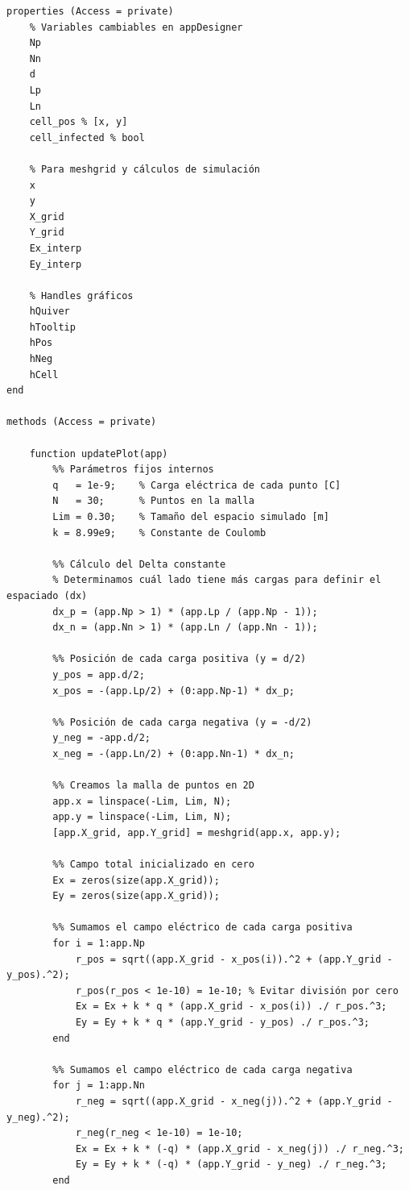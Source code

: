 \begin{lstlisting}[style=Matlab-editor]
properties (Access = private)
    % Variables cambiables en appDesigner
    Np
    Nn
    d
    Lp
    Ln
    cell_pos % [x, y]
    cell_infected % bool
    
    % Para meshgrid y cálculos de simulación
    x
    y
    X_grid
    Y_grid
    Ex_interp
    Ey_interp
    
    % Handles gráficos
    hQuiver
    hTooltip
    hPos
    hNeg
    hCell 
end

methods (Access = private)
    
    function updatePlot(app)
        %% Parámetros fijos internos
        q   = 1e-9;    % Carga eléctrica de cada punto [C]
        N   = 30;      % Puntos en la malla
        Lim = 0.30;    % Tamaño del espacio simulado [m]
        k = 8.99e9;    % Constante de Coulomb

        %% Cálculo del Delta constante
        % Determinamos cuál lado tiene más cargas para definir el espaciado (dx)
        dx_p = (app.Np > 1) * (app.Lp / (app.Np - 1));
        dx_n = (app.Nn > 1) * (app.Ln / (app.Nn - 1));
        
        %% Posición de cada carga positiva (y = d/2)
        y_pos = app.d/2;
        x_pos = -(app.Lp/2) + (0:app.Np-1) * dx_p;
        
        %% Posición de cada carga negativa (y = -d/2)
        y_neg = -app.d/2;
        x_neg = -(app.Ln/2) + (0:app.Nn-1) * dx_n;
        
        %% Creamos la malla de puntos en 2D
        app.x = linspace(-Lim, Lim, N);
        app.y = linspace(-Lim, Lim, N);
        [app.X_grid, app.Y_grid] = meshgrid(app.x, app.y);

        %% Campo total inicializado en cero
        Ex = zeros(size(app.X_grid));
        Ey = zeros(size(app.X_grid));

        %% Sumamos el campo eléctrico de cada carga positiva
        for i = 1:app.Np
            r_pos = sqrt((app.X_grid - x_pos(i)).^2 + (app.Y_grid - y_pos).^2);
            r_pos(r_pos < 1e-10) = 1e-10; % Evitar división por cero
            Ex = Ex + k * q * (app.X_grid - x_pos(i)) ./ r_pos.^3;
            Ey = Ey + k * q * (app.Y_grid - y_pos) ./ r_pos.^3;
        end

        %% Sumamos el campo eléctrico de cada carga negativa
        for j = 1:app.Nn
            r_neg = sqrt((app.X_grid - x_neg(j)).^2 + (app.Y_grid - y_neg).^2);
            r_neg(r_neg < 1e-10) = 1e-10;
            Ex = Ex + k * (-q) * (app.X_grid - x_neg(j)) ./ r_neg.^3;
            Ey = Ey + k * (-q) * (app.Y_grid - y_neg) ./ r_neg.^3;
        end


\end{lstlisting}
